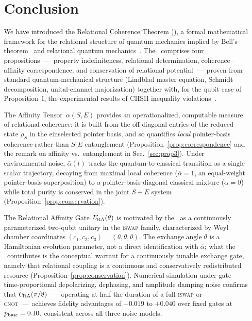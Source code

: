 
\section{Conclusion}
\label{sec:conc}

We have introduced the Relational Coherence Theorem (\RCT), a formal
mathematical framework for the relational structure of quantum mechanics
implied by Bell's theorem~\cite{Bell1964} and relational quantum
mechanics~\cite{Rovelli1996,Rovelli2021}.
The \RCT~comprises four propositions~---~property indefiniteness, relational
determination, coherence--affinity correspondence, and conservation of
relational potential~---~proven from standard quantum-mechanical
structure (Lindblad master equation, Schmidt decomposition, unital-channel
majorization) together with, for the qubit case of Proposition~I, the
experimental results of CHSH inequality
violations~\cite{CHSH1969,Aspect1982,Zeilinger2022Nobel}.

The Affinity Tensor~$\alpha(S,E)$ provides an operationalized, computable
measure of relational coherence: it is built from the off-diagonal
entries of the reduced state $\rho_S$ in the einselected pointer basis,
and so quantifies \emph{local} pointer-basis coherence rather than $S$-$E$
entanglement (Proposition~\ref{prop:correspondence} and the remark on
affinity vs.\ entanglement in Sec.~\ref{sec:prop3}).
Under environmental noise, $\bar\alpha(t)$ tracks the quantum-to-classical
transition as a single scalar trajectory, decaying from maximal local
coherence ($\bar\alpha = 1$, an equal-weight pointer-basis superposition)
to a pointer-basis-diagonal classical mixture ($\bar\alpha = 0$) while
total purity is conserved in the joint $S{+}E$ system
(Proposition~\ref{prop:conservation}).

The Relational Affinity Gate~$U_{\!\mathrm{RA}}(\theta)$ is motivated by the \RCT~as a
continuously parameterized two-qubit unitary in the \textsc{iswap} family,
characterized by Weyl chamber coordinates $(c_1, c_2, c_3) = (\theta, \theta, \theta)$.
The exchange angle $\theta$ is a Hamiltonian evolution parameter, not a
direct identification with $\bar\alpha$; what the \RCT~contributes is the
conceptual warrant for a continuously tunable exchange gate, namely that
relational coupling is a continuous and conservatively redistributed
resource (Proposition~\ref{prop:conservation}).
Numerical simulation under gate-time-proportional depolarizing, dephasing,
and amplitude damping noise confirms that $U_{\!\mathrm{RA}}(\pi/8)$~---~operating at
half the duration of a full \textsc{iswap} or \textsc{cnot}~---~achieves
fidelity advantages of $+0.019$ to $+0.040$ over fixed gates at
$p_{\rm base} = 0.10$, consistent across all three noise models.

